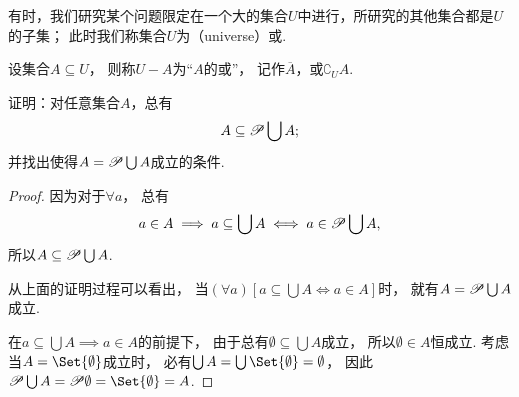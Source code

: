 \begin{definition}[全集、补集]
有时，我们研究某个问题限定在一个大的集合\(U\)中进行，所研究的其他集合都是\(U\)的子集；
此时我们称集合\(U\)为（universe）或.

设集合\(A \subseteq U\)，
则称\(U-A\)为“\(A\)的或”，
记作\(\overline{A}\)，或\(\complement_U A\).
\end{definition}

\begin{example}
证明：对任意集合\(A\)，总有
\begin{equation}\label{equation:集合论.系的并的幂集包含系}
	A \subseteq \mathscr{P} \bigcup A;
\end{equation}
并找出使得\(A = \mathscr{P} \bigcup A\)成立的条件.
\begin{proof}
因为对于\(\forall a\)，
总有\begin{equation*}
	a \in A
	\implies
	a \subseteq \bigcup A
	\iff
	a \in \mathscr{P} \bigcup A,
\end{equation*}
所以\(A \subseteq \mathscr{P} \bigcup A\).

从上面的证明过程可以看出，
当\((\forall a)
[a \subseteq \bigcup A \iff a \in A]\)时，
就有\(A = \mathscr{P} \bigcup A\)成立.

在\(a \subseteq \bigcup A \implies a \in A\)的前提下，
由于总有\(\emptyset \subseteq \bigcup A\)成立，
所以\(\emptyset \in A\)恒成立.
考虑当\(A = \Set{\emptyset}\)成立时，
必有\(\bigcup A = \bigcup\Set{\emptyset} = \emptyset\)，
因此\(\Powerset \bigcup A = \Powerset \emptyset = \Set{\emptyset} = A\).
\end{proof}
\end{example}
